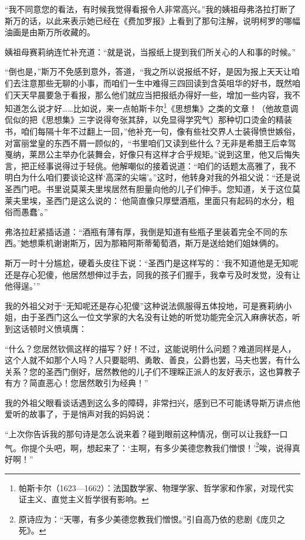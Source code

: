 \par “我不同意您的看法，有时候我觉得看报令人非常高兴。”我的姨祖母弗洛拉打断了斯万的话，以此来表示她已经在《费加罗报》上看到了那句注解，说明柯罗的哪幅油画是由斯万所收藏的。
\par 姨祖母赛莉纳连忙补充道：“就是说，当报纸上提到我们所关心的人和事的时候。”
\par “倒也是，”斯万不免感到意外，答道，“我之所以说报纸不好，是因为报上天天让咱们去注意那些无聊的小事，而咱们一生中难得三四回读到含英咀华的好书，既然咱们天天早晨要急于看报，那么他们就应当把报纸办得好一些，增加一些内容，我不知道怎么说才好……比如说，来一点帕斯卡尔\footnote{帕斯卡尔（1623—1662）：法国数学家、物理学家、哲学家和作家，对现代实证主义、直觉主义哲学很有影响。}《思想集》之类的文章！（他故意调侃似的把《思想集》三字说得夸张其辞，以免显得学究气）那种切口烫金的精装书，咱们每隔十年不过翻上一回，”他补充一句，像有些社交界人士装得愤世嫉俗，对富丽堂皇的东西不屑一顾似的，“书里咱们又读到些什么？无非是希腊王后幸驾戛纳，莱昂公主举办化装舞会，好像只有这样才合乎规矩。”说到这里，他又后悔失言，把正经事说得过于轻佻。他解嘲似的接着说道：“咱们的话题太高雅了，我不明白为什么咱们要谈论这样‘高深的尖端’。”这时，他转身对我的外祖父说：“还是说圣西门吧。书里说莫莱夫里埃居然有胆量向他的儿子们伸手。您知道，关于这位莫莱夫里埃，圣西门是这么说的：‘他简直像只厚壁酒瓶，里面只有起码的水分，粗俗而愚蠢’。”
\par 弗洛拉赶紧插话道：“酒瓶有薄有厚，我倒是知道有些瓶子里装着完全不同的东西。”她想乘机谢谢斯万，因为那箱阿斯蒂葡萄酒，斯万是送给她们姐妹俩的。
\par 斯万一时十分尴尬，硬着头皮往下说：“圣西门是这样写的：‘我不知道他是无知呢还是存心犯傻，他居然想伸过手去，同我的孩子们握手，我幸亏及时发觉，没有让他得逞。’”
\par 我的外祖父对于“无知呢还是存心犯傻”这种说法佩服得五体投地，可是赛莉纳小姐，由于圣西门这么一位文学家的大名没有让她的听觉功能完全沉入麻痹状态，听到这话顿时义愤填膺：
\par “什么？您居然钦佩这样的描写？好！不过，这能说明什么问题？难道同样是人，这个人就不如那个人吗？人只要聪明、勇敢、善良，公爵也罢，马夫也罢，有什么关系？您的圣西门倒好，居然教他的儿子们不理睬正派人的友好表示，这也算教子有方？简直恶心！您居然敢引为经典！”
\par 我的外祖父眼看谈话遇到这么多的障碍，非常扫兴，感到已不可能诱导斯万讲点他爱听的故事了，于是悄声对我的妈妈说：
\par “上次你告诉我的那句诗是怎么说来着？碰到眼前这种情况，倒可以让我舒一口气。你提个头吧，啊，想起来了：‘主啊，有多少美德您教我们憎恨！’\footnote{原诗应为：“天哪，有多少美德您教我们憎恨。”引自高乃依的悲剧《庞贝之死》。}唉，说得真好啊！”
